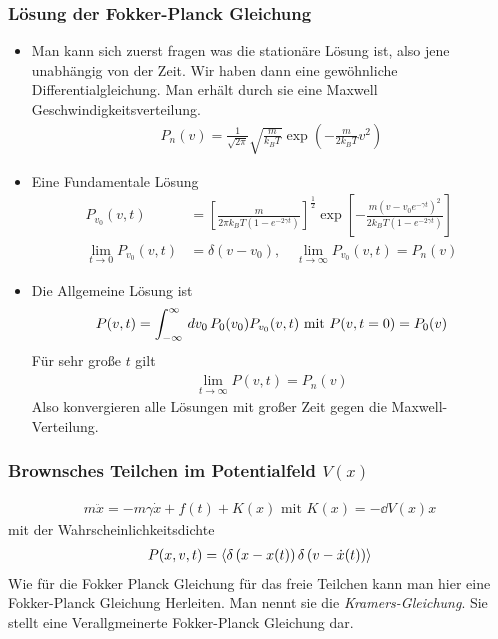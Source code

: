 \subsubsection*{Lösung der Fokker-Planck Gleichung}
\begin{itemize}
  \item Man kann sich zuerst fragen was die stationäre Lösung ist, also jene
    unabhängig von der Zeit. Wir haben dann eine gewöhnliche Differentialgleichung.
    Man erhält durch sie eine Maxwell Geschwindigkeitsverteilung.
    \begin{align*}
      P_n(v) = \frac{1}{\sqrt{2 \pi }} \sqrt{\frac{m}{k_B T}} \exp\left( -  \frac{m}{2 k_B T} v^2 \right)
    \end{align*}
  \item
    Eine Fundamentale Lösung
    \begin{align*}
      P_{v_0}(v,t) & = \left[ \frac{m}{2 \pi k_B T\left( 1- e^{-2 \gamma t} \right)} \right]^{\frac{1}{2}}
      \exp\left[ - \frac{m \left( v - v_0 e^{-\gamma t} \right)^2}{2 k_B T\left( 1 - e^{-2\gamma t} \right)} \right] \\
      \lim_{t\to 0} P_{v_0} (v,t) & = \delta(v - v_0), \quad \lim_{t\to \infty} P_{v_0}(v,t) = P_n(v)
    \end{align*}
  \item Die Allgemeine Lösung ist
    \begin{align*}
      P(v,t) = \int_{-\infty}^{\infty} \,dv_0\, P_0(v_0) P_{v_0}(v,t) \text{ mit }
      P(v,t=0) = P_0(v)
    \end{align*}
    Für sehr große $t$ gilt
    \begin{align*}
      \lim_{t\to \infty} P(v, t) = P_n(v)
    \end{align*}
    Also konvergieren alle Lösungen  mit großer Zeit gegen die Maxwell-Verteilung.

\end{itemize}

\subsubsection*{Brownsches Teilchen im Potentialfeld $V(x)$}

%
\begin{align*}
  m \ddot{x} = - m \gamma \dot{x} + f(t) + K(x) \text{ mit } K(x) = - \dd{V(x)}{x}
\end{align*}
%
mit der Wahrscheinlichkeitsdichte
%
\begin{align*}
  P(x,v,t) = \Braket{\delta\left( x - x(t) \right) \delta\left( v - \dot{x}(t) \right)}
\end{align*}
%
Wie für die Fokker Planck Gleichung für das freie Teilchen kann man hier
eine Fokker-Planck Gleichung Herleiten. Man nennt sie die \emph{Kramers-Gleichung}.
Sie stellt eine Verallgmeinerte Fokker-Planck Gleichung dar.

